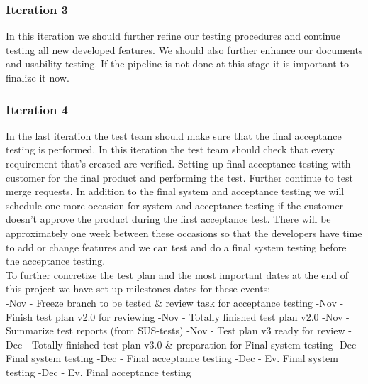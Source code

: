 \subsubsection{Iteration 3}
In this iteration we should further refine our testing procedures and continue testing all new developed features. We should also further enhance our documents and usability testing. If the pipeline is not done at this stage it is important to finalize it now. 


\subsubsection{Iteration 4}
In the last iteration the test team should make sure that the final acceptance testing is performed. In this iteration the test team should check that every requirement that's created are verified.     
Setting up final acceptance testing with customer for the final product and performing the test. Further continue to test merge requests. In addition to the final system and acceptance testing we will schedule one more occasion for system and acceptance testing if the customer doesn't approve the product during the first acceptance test. There will be approximately one week between these occasions so that the developers have time to add or change features and we can test and do a final system testing before the acceptance testing. \\


\noindent To further concretize the test plan and the most important dates at the end of this project we have set up milestones dates for these events:\\
-Nov - Freeze branch to be tested \& review task for acceptance testing\newline
{}-Nov - Finish test plan v2.0 for reviewing\newline
{}-Nov - Totally finished test plan v2.0\newline
{}-Nov - Summarize test reports (from SUS-tests)\newline
{}-Nov - Test plan v3 ready for review\newline
{}-Dec - Totally finished test plan v3.0 \& preparation for Final system testing\newline
{}-Dec - Final system testing\newline
{}-Dec - Final acceptance testing\newline
{}-Dec - Ev. Final system testing\newline
{}-Dec - Ev. Final acceptance testing\newline



